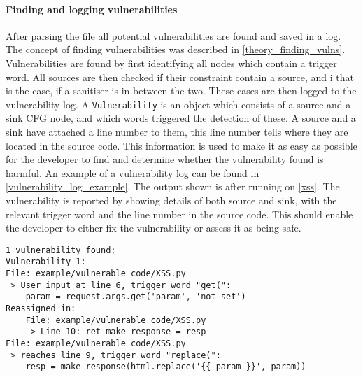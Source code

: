 \paragraph{Finding and logging vulnerabilities}
After parsing the file all potential vulnerabilities are found and saved in a log.
The concept of finding vulnerabilities was described in \cref{theory_finding_vulns}.
Vulnerabilities are found by first identifying all nodes which contain a trigger word.
All sources are then checked if their constraint contain a source, and i that is the case, if a sanitiser is in between the two.
These cases are then logged to the vulnerability log.
A \texttt{Vulnerability} is an object which consists of a source and a sink CFG node, and which words triggered the detection of these.
A source and a sink have attached a line number to them, this line number tells where they are located in the source code.
This information is used to make it as easy as possible for the developer to find and determine whether the vulnerability found is harmful.
An example of a vulnerability log can be found in \cref{vulnerability_log_example}.
The output shown is after running \pyt{} on \cref{xss}.
The vulnerability is reported by showing details of both source and sink, with the relevant trigger word and the line number in the source code.
This should enable the developer to either fix the vulnerability or assess it as being safe.

\begin{lstlisting}[style=default, caption={An example of how the vulnerability log looks after it found one vulnerability.}, label={vulnerability_log_example}]
1 vulnerability found:
Vulnerability 1:
File: example/vulnerable_code/XSS.py
 > User input at line 6, trigger word "get(": 
	param = request.args.get('param', 'not set')
Reassigned in: 
	File: example/vulnerable_code/XSS.py
	 > Line 10: ret_make_response = resp
File: example/vulnerable_code/XSS.py
 > reaches line 9, trigger word "replace(": 
	resp = make_response(html.replace('{{ param }}', param))
\end{lstlisting}

